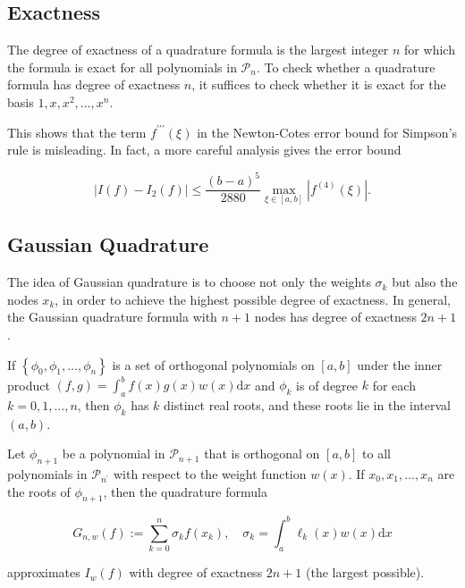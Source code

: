 \subsection{Exactness}

\begin{definition}
  The degree of exactness of a quadrature formula is the largest integer \(n\) for which the formula is exact for all polynomials in \(\mathcal{P}_n\). To check whether a quadrature formula has degree of exactness \(n\), it suffices to check whether it is exact for the basis \(1, x, x^2, \ldots, x^n\).
\end{definition}

\begin{remark}
  This shows that the term \(f^{\prime \prime \prime}(\xi)\) in the Newton-Cotes error bound for Simpson's rule is misleading. In fact, a more careful analysis gives the error bound

\[
\left|I(f)-I_2(f)\right| \leq \frac{(b-a)^5}{2880} \max _{\xi \in[a, b]}\left|f^{(4)}(\xi)\right| .
\]
\end{remark}

\subsection{Gaussian Quadrature}

\begin{remark}
  The idea of Gaussian quadrature is to choose not only the weights \(\sigma_k\) but also the nodes \(x_k\), in order to achieve the highest possible degree of exactness. In general, the Gaussian quadrature formula with \(n+1\) nodes has degree of exactness \(2 n+1\).
\end{remark}

\begin{theorem}
  If \(\left\{\phi_0, \phi_1, \ldots, \phi_n\right\}\) is a set of orthogonal polynomials on \([a, b]\) under the inner product \((f, g)=\int_a^b f(x) g(x) w(x) \mathrm{d} x\) and \(\phi_k\) is of degree \(k\) for each \(k=0,1, \ldots, n\), then \(\phi_k\) has \(k\) distinct real roots, and these roots lie in the interval \((a, b)\).
\end{theorem}

\begin{theorem}
  Let \(\phi_{n+1}\) be a polynomial in \(\mathcal{P}_{n+1}\) that is orthogonal on \([a, b]\) to all polynomials in \(\mathcal{P}_{n^{\prime}}\) with respect to the weight function \(w(x)\). If \(x_0, x_1, \ldots, x_n\) are the roots of \(\phi_{n+1}\), then the quadrature formula

\[
G_{n, w}(f):=\sum_{k=0}^n \sigma_k f\left(x_k\right), \quad \sigma_k=\int_a^b \ell_k(x) w(x) \mathrm{d} x
\]

approximates \(I_w(f)\) with degree of exactness \(2 n+1\) (the largest possible).
\end{theorem}

